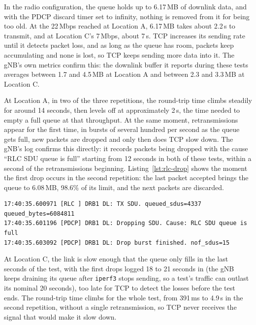 In the radio configuration, the queue holds up to 6.17\,MB of downlink data, and with the \gls{PDCP} discard timer set to infinity, nothing is removed from it for being too old. At the 22\,Mbps reached at Location A, 6.17\,MB takes about 2.2\,s to transmit, and at Location C's 7\,Mbps, about 7\,s. TCP increases its sending rate until it detects packet loss, and as long as the queue has room, packets keep accumulating and none is lost, so TCP keeps sending more data into it. The \gls{gNB}'s own metrics confirm this: the downlink buffer it reports during these tests averages between 1.7 and 4.5\,MB at Location A and between 2.3 and 3.3\,MB at Location C.

At Location A, in two of the three repetitions, the round-trip time climbs steadily for around 14 seconds, then levels off at approximately 2\,s, the time needed to empty a full queue at that throughput. At the same moment, retransmissions appear for the first time, in bursts of several hundred per second as the queue gets full, new packets are dropped and only then does TCP slow down. The \gls{gNB}'s log confirms this directly: it records packets being dropped with the cause ``\gls{RLC} SDU queue is full'' starting from 12 seconds in both of these tests, within a second of the retransmissions beginning. Listing~\ref{lst:rlc-drop} shows the moment the first drop occurs in the second repetition: the last packet accepted brings the queue to 6.08\,MB, 98.6\% of its limit, and the next packets are discarded.

\begin{lstlisting}[backgroundcolor=\color{gray!20},frame=single,framerule=0.8pt,rulecolor=\color{black},basicstyle=\ttfamily\small,columns=fixed,keepspaces=true,caption={First queue-full drop in \texttt{gnb.log} during the second Location A TCP downlink test in Round~3, 13.6 seconds into the test, shortened to the relevant fields.},label={lst:rlc-drop}]
17:40:35.600971 [RLC ] DRB1 DL: TX SDU. queued_sdus=4337 queued_bytes=6084811
17:40:35.601196 [PDCP] DRB1 DL: Dropping SDU. Cause: RLC SDU queue is full
17:40:35.603092 [PDCP] DRB1 DL: Drop burst finished. nof_sdus=15
\end{lstlisting}

At Location C, the link is slow enough that the queue only fills in the last seconds of the test, with the first drops logged 18 to 21 seconds in (the \gls{gNB} keeps draining its queue after \texttt{iperf3} stops sending, so a test's traffic can outlast its nominal 20 seconds), too late for TCP to detect the losses before the test ends. The round-trip time climbs for the whole test, from 391\,ms to 4.9\,s in the second repetition, without a single retransmission, so TCP never receives the signal that would make it slow down.

